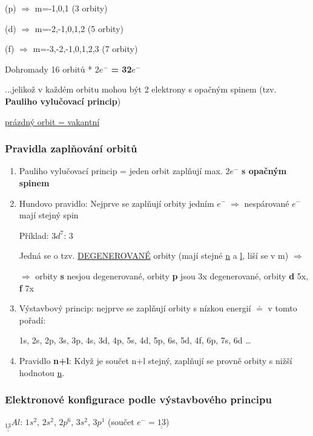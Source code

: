     (p) $\Rightarrow$ m=-1,0,1 (3 orbity)

    (d) $\Rightarrow$ m=-2,-1,0,1,2 (5 orbity)

    (f) $\Rightarrow$ m=-3,-2,-1,0,1,2,3 (7 orbity)

\medskip
Dohromady 16 orbitů * 2$e^-$ \textbf{= 32$e^-$}

...jelikož v každém orbitu mohou být 2 elektrony s opačným spinem (tzv. \textbf{Pauliho vylučovací princip})

\bigskip
\fbox{\phantom{$\uparrow$ }} \underline{prázdný orbit = vakantní}

\subsubsection{Pravidla zaplňování orbitů}
\begin{enumerate}
    \item Pauliho vylučovací princip = jeden orbit zaplňují max. $2e^-$ \textbf{s opačným  spinem} 
    \item Hundovo pravidlo: Nejprve se zaplňují orbity jedním $e^- \; \Rightarrow$ nespárované $e^-$ mají stejný spin
    
    Příklad: $3d^7$: 3 \fbox{$\downarrow\textcolor{magenta}{\uparrow}$}\fbox{$\downarrow\textcolor{magenta}{\uparrow}$}\fbox{$\downarrow\textcolor{magenta}{.}$}\fbox{$\downarrow\textcolor{magenta}{.}$}\fbox{$\downarrow\textcolor{magenta}{.}$}
    
    Jedná se o tzv. \underline{DEGENEROVANÉ} orbity (mají stejné \underline{n} a \underline{l}, liší se v m) $\Rightarrow$
    
    $\Rightarrow$ orbity \textbf{s} nesjou degenerované, orbity \textbf{p} jsou 3x degenerované, orbity \textbf{d} 5x, \textbf{f} 7x
    \item Výstavbový princip: nejprve se zaplňují orbity s nízkou energií $\doteq$ v tomto pořadí:
    
    1s, 2s, 2p, 3s, 3p, 4s, 3d, 4p, 5s, 4d, 5p, 6s, 5d, 4f, 6p, 7s, 6d \dots
    \item Pravidlo \textbf{n+l}: Když je součet n+l stejný, zaplňují se provně orbity s nižší hodnotou \underline{n}.
\end{enumerate}

\subsubsection{Elektronové konfigurace podle výstavbového principu}
$\underline{\underline{_{13}}}Al$: $1s^2$, $2s^2$, $2p^6$, $3s^2$, $3p^1$ (součet $e^- = \underline{\underline{13}}$)

